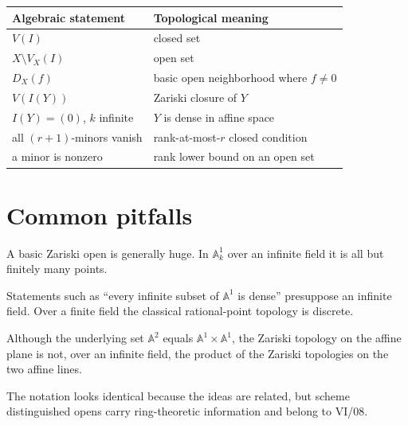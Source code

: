 \begin{center}
\begin{tabular}{@{}p{}p{}@{}}
\toprule
\textbf{Algebraic statement} & \textbf{Topological meaning}\\
\midrule
\(V(I)\) & closed set\\
\(X\setminus V_X(I)\) & open set\\
\(D_X(f)\) & basic open neighborhood where \(f\neq0\)\\
\(V(I(Y))\) & Zariski closure of \(Y\)\\
\(I(Y)=(0)\), \(k\) infinite & \(Y\) is dense in affine space\\
all \((r+1)\)-minors vanish & rank-at-most-\(r\) closed condition\\
a minor is nonzero & rank lower bound on an open set\\
\bottomrule
\end{tabular}
\end{center}

\section{Common pitfalls}
\label{sec:vi02-pitfalls}

\begin{warning}
A basic Zariski open is generally huge.  In \(\mathbb A_k^1\) over an infinite field it is
all but finitely many points.
\end{warning}

\begin{warning}
Statements such as ``every infinite subset of \(\mathbb A^1\) is dense'' presuppose an
infinite field.  Over a finite field the classical rational-point topology is discrete.
\end{warning}

\begin{warning}
Although the underlying set \(\mathbb A^2\) equals \(\mathbb A^1\times\mathbb A^1\), the
Zariski topology on the affine plane is not, over an infinite field, the product of the
Zariski topologies on the two affine lines.
\end{warning}

\begin{warning}
The notation looks identical because the ideas are related, but scheme distinguished opens
carry ring-theoretic information and belong to VI/08.
\end{warning}

